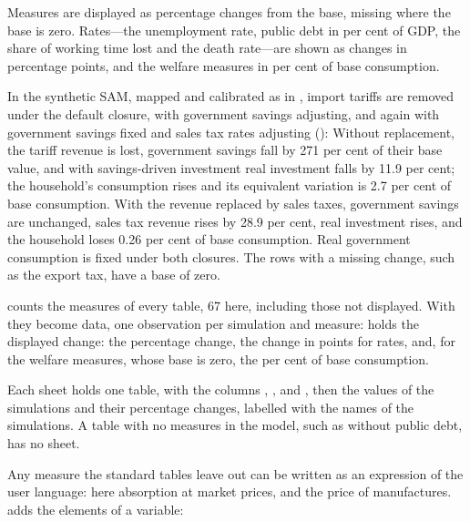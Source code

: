 Measures are displayed as percentage changes from the base, missing where the
base is zero. Rates---the unemployment rate, public debt in per cent of GDP,
the share of working time lost and the death rate---are shown as changes in
percentage points, and the welfare measures in per cent of base consumption.


In the synthetic SAM, mapped and calibrated as in , import
tariffs are removed under the default closure, with government savings
adjusting, and again with government savings fixed and sales tax rates
adjusting ():
Without replacement, the tariff revenue is lost, government savings fall by
271 per cent of their base value, and with savings-driven investment real
investment falls by 11.9 per cent; the household's consumption rises and its
equivalent variation is 2.7 per cent of base consumption. With the revenue
replaced by sales taxes, government savings are unchanged, sales tax revenue
rises by 28.9 per cent, real investment rises, and the household loses 0.26 per
cent of base consumption. Real government consumption is fixed under both
closures. The rows with a missing change, such as the export tax, have a base
of zero.


 counts the measures of every table, 67 here, including
those not displayed. With  they become data, one observation per
simulation and measure:
 holds the displayed change: the percentage change, the change in
points for rates, and, for the welfare measures, whose base is zero, the per
cent of base consumption.


Each sheet holds one table, with the columns , ,
 and , then the values of the simulations and their
percentage changes, labelled with the names of the simulations. A table with
no measures in the model, such as  without public debt, has no
sheet.


Any measure the standard tables leave out can be written as an expression of
the user language: here absorption at market prices, and the price of
manufactures.  adds the elements of a variable:

